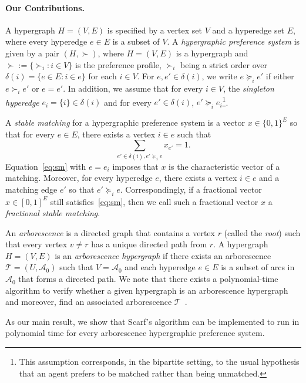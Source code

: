 \documentclass[11pt]{article}
\begin{document}
\paragraph{Our Contributions.}
A hypergraph  $H=(V,E)$ is specified by a vertex set $V$ and a hyperedge set $E$, where every hyperedge $e\in E$ is a subset of $V$.
A \emph{hypergraphic preference system} is given by a pair $(H, \succ)$, where $H=(V,E)$ is a hypergraph and $\succ:=\{\succ_i:i\in V\}$ is the preference profile, $\succ_i$ being a strict order over $\delta(i)=\{e\in E:i\in e \}$ for each $i\in V$. For $e, e' \in \delta(i)$, we write $e\succeq_i e'$ if either $e\succ_i e'$ or $e=e'$. In addition, we assume that for every $i\in V$, the \emph{singleton hyperedge} $e_i=\{i\}\in\delta(i)$ and for every $e'\in\delta(i)$, $e'\succeq_i e_i$\footnote{This assumption corresponds, in the bipartite setting, to the usual hypothesis that an agent prefers to be matched rather than being unmatched.}. 





A \emph{stable matching} for a hypergraphic preference system is a vector $x\in\{0,1\}^E$ so that for every $e\in E$, there exists a vertex $i\in e$ such that
\begin{equation}\label{eq:sm}
    \sum_{e'\in\delta(i),e'\succeq_i e}x_{e'}=1.
\end{equation}
Equation~\eqref{eq:sm} with $e=e_i$ imposes that $x$ is the characteristic vector of a matching. Moreover, for every hyperedge $e$, there exists a vertex $i \in e$ and a matching edge $e'$ so that $e'\succeq_i e$. Correspondingly, if a fractional vector $x\in[0,1]^E$ still satisfies~\eqref{eq:sm}, then we call such a fractional vector $x$ a \emph{fractional stable matching}.


An \emph{arborescence} is a directed graph that contains a vertex $r$ (called the \emph{root}) such that every vertex $v\neq r$ has a unique directed path from $r$. A hypergraph $H=(V,E)$ is an \emph{arborescence hypergraph} if there exists an arborescence $\mathcal{T}=(U, \mathcal{A}_0)$ such that $V=\mathcal{A}_0$ and each hyperedge $e\in E$ is a subset of arcs in $\mathcal{A}_0$ that forms a directed path. We note that there exists a polynomial-time algorithm to verify whether a given hypergraph is an arborescence hypergraph and moreover, find an associated arborescence $\mathcal{T}$~\cite{schrijver1998theory}. 

As our main result, we show that Scarf's algorithm can be implemented to run in polynomial time for every arborescence hypergraphic preference system.
\end{document}
